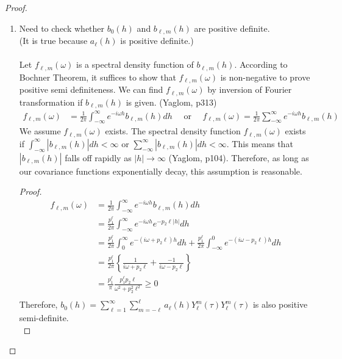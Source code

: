 \documentclass[11pt]{article}
\begin{document}
\begin{itemize}
\begin{proof}
\begin{enumerate}
\item
Need to check whether $b_{0}(h)$ and $b_{\ell,m}(h)$ are positive definite.\\ 
(It is true because $a_\ell(h)$ is positive definite.)\\
\\
Let $f_{\ell,m}(\omega)$ is a spectral density function of $b_{\ell,m}(h)$. According to Bochner Theorem, it suffices to show that $f_{\ell,m}(\omega)$ is non-negative to prove positive semi definiteness. We can find $f_{\ell,m}(\omega)$ by inversion of Fourier transformation if $b_{\ell,m}(h)$ is given. (Yaglom, p313)\\
\begin{align*}
f_{\ell,m}(\omega) &=  \frac{1}{2\pi} \int_{-\infty}^\infty e^{-i\omega h} b_{\ell,m}(h) dh \quad \text{ or } \quad f_{\ell,m}(\omega) =  \frac{1}{2\pi} \sum_{-\infty}^\infty e^{-i\omega h} b_{\ell,m}(h) 
\end{align*}
We assume  $f_{\ell,m}(\omega)$ exists. The spectral density function $f_{\ell,m}(\omega)$ exists if $\int_{-\infty}^\infty |b_{\ell,m}(h)|dh < \infty$ or $\sum_{-\infty}^\infty |b_{\ell,m}(h)|dh < \infty$. This means that $|b_{\ell,m}(h)|$ falls off rapidly as $|h| \rightarrow \infty$ (Yaglom, p104). Therefore, as long as our covariance functions exponentially decay, this assumption is reasonable.\\
\begin{proof}
\begin{align*}
f_{\ell,m}(\omega) &= \frac{1}{2\pi} \int_{-\infty}^\infty e^{-i\omega h} b_{\ell,m}(h) dh\\
&= \frac{p_1^\ell}{2\pi} \int_{-\infty}^\infty e^{-i\omega h} e^{-p_2 \ell |h|} dh\\
&= \frac{p_1^\ell}{2\pi} \int_{0}^\infty e^{-(i \omega + p_2 \ell) h} dh + \frac{p_1^\ell}{2\pi} \int_{-\infty}^0 e^{-(i \omega - p_2 \ell) h} dh\\
&= \frac{p_1^\ell}{2\pi} \left\{ \frac{1}{i \omega + p_2 \ell} + \frac{-1}{i \omega - p_2 \ell} \right\}\\
&= \frac{p_1^\ell}{\pi} \frac{p_1^\ell p_2 \ell}{\omega^2 + p_2^2 \ell^2} \ge 0\\
\end{align*}
Therefore, $b_0(h)=\sum_{\ell=1}^{\infty} \sum_{m=-\ell}^{\ell} a_{\ell}(h) Y_{\ell}^{m}(\tau) Y_{\ell}^{m}(\tau)$ is also positive semi-definite.\\
\end{proof}


\end{enumerate}
\end{proof}
\end{itemize}
\end{document}
